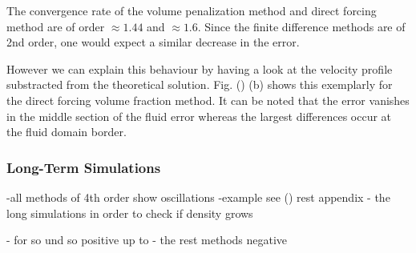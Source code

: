 The convergence rate of the volume penalization method and direct forcing method are of order $\approx 1.44$ and $\approx 1.6$.
Since the finite difference methods are of 2nd order, one would expect a similar decrease in the error.

However we can explain this behaviour by having a look at the velocity profile substracted from the theoretical solution.
Fig. () (b) shows this exemplarly for the direct forcing volume fraction method. It can be noted that
the error vanishes in the middle section of the fluid error whereas the largest differences occur at the fluid domain border.


\subsubsection{Long-Term Simulations}

-all methods of 4th order show oscillations
-example see () rest appendix
- the long simulations in order to check if density grows

- for so und so positive up to
- the rest methods negative



